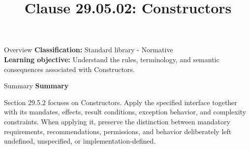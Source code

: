 \documentclass[10pt,letterpaper]{article}
\title{Clause 29.05.02: Constructors}
\author{}
\date{}
\begin{document}
\maketitle
\begin{CornellOverviewBox}{Overview}
\textbf{Classification:} Standard library - Normative\\[2pt]
\textbf{Learning objective:} Understand the rules, terminology, and semantic consequences associated with Constructors.
\end{CornellOverviewBox}\begin{CornellSummaryBox}{Summary}
{\sffamily\bfseries\color{Accent} Summary}\par\vspace{3pt}Section 29.5.2 focuses on Constructors. Apply the specified interface together with its mandates, effects, result conditions, exception behavior, and complexity constraints. When applying it, preserve the distinction between mandatory requirements, recommendations, permissions, and behavior deliberately left undefined, unspecified, or implementation-defined.
\end{CornellSummaryBox}
\end{document}
